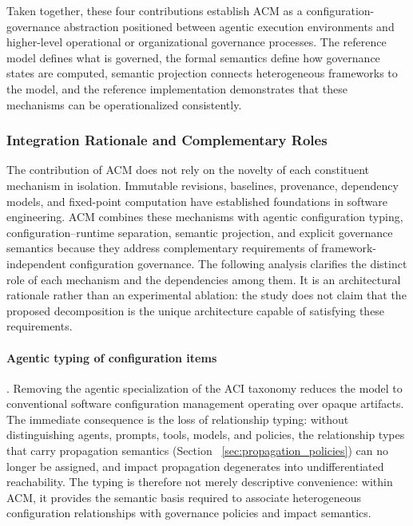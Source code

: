 \documentclass[10pt]{article}
\begin{document}
Taken together, these four contributions establish ACM as a configuration-governance abstraction positioned between agentic execution environments and higher-level operational or organizational governance processes. The reference model defines what is governed, the formal semantics define how governance states are computed, semantic projection connects heterogeneous frameworks to the model, and the reference implementation demonstrates that these mechanisms can be operationalized consistently.

\subsubsection{Integration Rationale and Complementary Roles}
\label{subsec:ablation_mechanism}

The contribution of ACM does not rely on the novelty of each constituent mechanism in isolation. Immutable revisions, baselines, provenance, dependency models, and fixed-point computation have established foundations in software engineering. ACM combines these mechanisms with agentic configuration typing, configuration--runtime separation, semantic projection, and explicit governance semantics because they address complementary requirements of framework-independent configuration governance. The following analysis clarifies the distinct role of each mechanism and the dependencies among them. It is an architectural rationale rather than an experimental ablation: the study does not claim that the proposed decomposition is the unique architecture capable of satisfying these requirements.

\paragraph{Agentic typing of configuration items}. Removing the agentic specialization of the ACI taxonomy reduces the model to conventional software configuration management operating over opaque artifacts. The immediate consequence is the loss of relationship typing: without distinguishing agents, prompts, tools, models, and policies, the relationship types that carry propagation semantics (Section ~\ref{sec:propagation_policies}) can no longer be assigned, and impact propagation degenerates into undifferentiated reachability. The typing is therefore not merely descriptive convenience: within ACM, it provides the semantic basis required to associate heterogeneous configuration relationships with governance policies and impact semantics.
\end{document}

